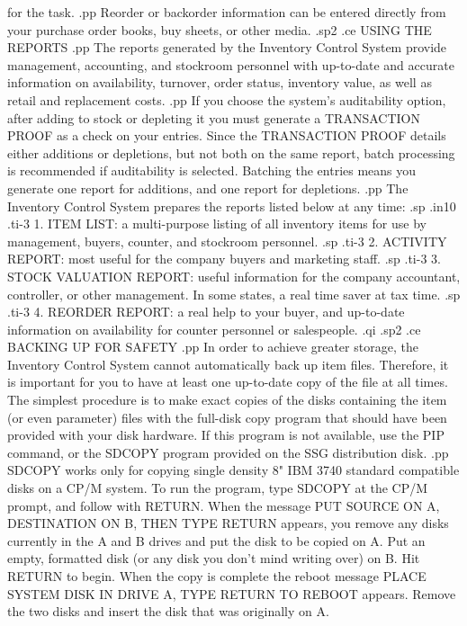 for the task.
.pp
Reorder or backorder information can be entered directly from your purchase
order books, buy sheets, or other media.
.sp2
.ce
USING THE REPORTS
.pp
The reports generated by the Inventory Control System provide
management, accounting, and stockroom personnel with up-to-date
and accurate
information on availability, turnover, order status, inventory value,
as well as retail and replacement costs.
.pp
If you choose the system's auditability option,
after adding to stock or depleting it you must generate a TRANSACTION
PROOF as a check on your entries.
Since the TRANSACTION PROOF details either additions or depletions,
but not both on the same report, batch processing is recommended if
auditability is selected.
Batching the entries means you generate one report for
additions, and one report for depletions.
.pp
The Inventory Control System prepares the reports listed below at any time:
.sp
.in10
.ti-3
1. ITEM LIST: a multi-purpose listing of all inventory items for use by
management, buyers, counter, and
stockroom personnel.
.sp
.ti-3
2. ACTIVITY REPORT: most useful for the company buyers and marketing
staff.
.sp
.ti-3
3. STOCK VALUATION REPORT: useful information for the company accountant,
controller, or other management. In some states, a real time saver at tax
time.
.sp
.ti-3
4. REORDER REPORT: a real help to your buyer, and up-to-date information
on availability for counter personnel or salespeople.
.qi
.sp2
.ce
BACKING UP FOR SAFETY
.pp
In order to achieve greater storage, the Inventory Control System
cannot automatically back up item files.  Therefore, it is important
for you to have at least one up-to-date copy of the file at all
times.	The simplest procedure is to make exact copies of the disks
containing the item (or even parameter) files with the full-disk copy
program that should have been provided with your disk hardware.  If this
program is not available, use the PIP command, or the SDCOPY program
provided on the SSG distribution disk.
.pp
SDCOPY works only for copying single density 8" IBM 3740 standard
compatible disks on a CP/M system.  To run the program, type SDCOPY at
the CP/M prompt, and follow with RETURN.  When the message PUT SOURCE ON
A, DESTINATION ON B, THEN TYPE RETURN appears, you remove any disks
currently in the A and B drives and put the disk to be copied on A.  Put
an empty, formatted disk (or any disk you don't mind writing over) on B.
Hit RETURN to begin.  When the copy is complete the reboot message
PLACE SYSTEM DISK IN DRIVE A, TYPE RETURN TO REBOOT appears.  Remove the
two disks and insert the disk that was originally on A.
